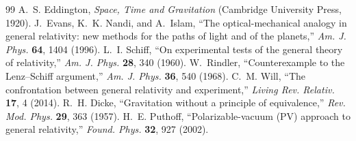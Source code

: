 \documentclass[11pt]{article}
\theoremstyle{plain}
\theoremstyle{remark}
\begin{document}
\begin{thebibliography}{99}
A.~S. Eddington, \emph{Space, Time and Gravitation} (Cambridge University Press, 1920).
J.~Evans, K.~K. Nandi, and A.~Islam, ``The optical-mechanical analogy in general relativity: new methods for the paths of light and of the planets,'' \emph{Am. J. Phys.} \textbf{64}, 1404 (1996).
L.~I. Schiff, ``On experimental tests of the general theory of relativity,'' \emph{Am. J. Phys.} \textbf{28}, 340 (1960).
W.~Rindler, ``Counterexample to the Lenz--Schiff argument,'' \emph{Am. J. Phys.} \textbf{36}, 540 (1968).
C.~M. Will, ``The confrontation between general relativity and experiment,'' \emph{Living Rev. Relativ.} \textbf{17}, 4 (2014).
R.~H. Dicke, ``Gravitation without a principle of equivalence,'' \emph{Rev. Mod. Phys.} \textbf{29}, 363 (1957).
H.~E. Puthoff, ``Polarizable-vacuum (PV) approach to general relativity,'' \emph{Found. Phys.} \textbf{32}, 927 (2002).
\end{thebibliography}
\end{document}
